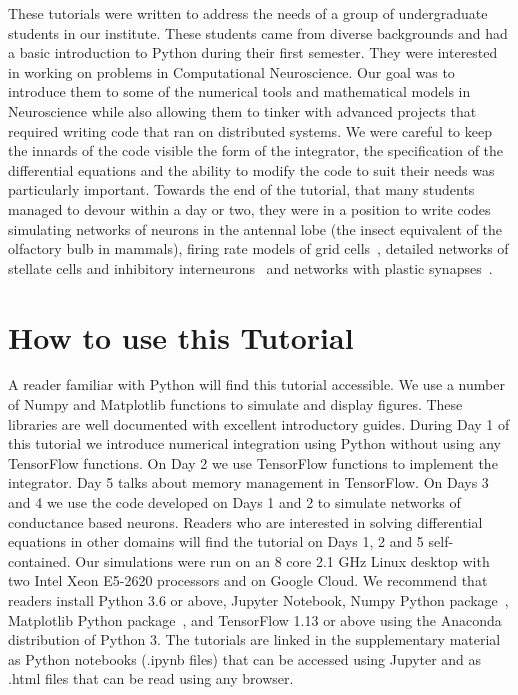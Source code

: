 \documentclass[10pt,letterpaper]{article}
\begin{document}
These tutorials were written to address the needs of a group of undergraduate students in our institute. These students came from diverse backgrounds and had a basic introduction to Python during their first semester. They were interested in working on problems in Computational Neuroscience. Our goal was to introduce them to some of the numerical tools and mathematical models in Neuroscience while also allowing them to tinker with advanced projects that required writing code that ran on distributed systems. We were careful to keep the innards of the code visible \textemdash the form of the integrator, the specification of the differential equations and the ability to modify the code to suit their needs was particularly important. Towards the end of the tutorial, that many students managed to devour within a day or two, they were in a position to write codes simulating networks of neurons in the antennal lobe  \cite{Bazhenov2001}  (the insect equivalent of the olfactory bulb in mammals), firing rate models of grid cells~\cite{Burak2009}, detailed networks of stellate cells and inhibitory interneurons~\cite{Neru2019} and networks with plastic synapses~\cite{Bazhenov2005}. 


\section*{How to use this Tutorial}
A reader familiar with Python will find this tutorial accessible. We use a number of Numpy and Matplotlib functions to simulate and display figures. These libraries are well documented with excellent introductory guides. During Day 1 of this tutorial we introduce numerical integration using Python without using any TensorFlow functions. On Day 2 we use TensorFlow functions to implement the integrator. Day 5 talks about memory management in TensorFlow. On Days 3 and 4 we use the code developed on Days 1 and 2 to simulate networks of conductance based neurons. Readers who are interested in solving differential equations in other domains will find the tutorial on Days 1, 2 and 5 self-contained.  Our simulations were run on an 8 core 2.1 GHz Linux desktop with two Intel Xeon E5-2620 processors  and on Google Cloud. We recommend that readers install Python 3.6 or above, Jupyter Notebook, Numpy Python package~\cite{numpy}, Matplotlib Python package~\cite{matplotlib}, and TensorFlow 1.13 or above using the Anaconda distribution of Python 3. The tutorials are linked in the supplementary material as Python notebooks (.ipynb files) that can be accessed using Jupyter and as .html files that can be read using any browser.
\end{document}
